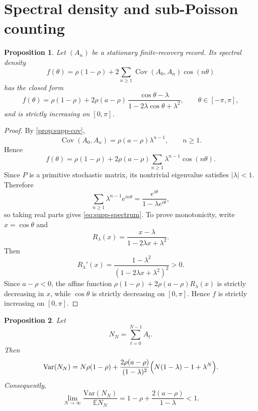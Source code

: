 \documentclass[11pt]{amsart}
\numberwithin{equation}{section}
\newtheorem{proposition}{Proposition}[section]
\theoremstyle{remark}
\newcommand{\EE}{\mathbb{E}}
\newcommand{\Var}{\mathrm{Var}}
\begin{document}
\section{Spectral density and sub-Poisson counting}\label{sec:supp-spectrum}

\begin{proposition}\label{prop:supp-spectrum}
Let $(A_n)$ be a stationary finite-recovery record. Its spectral density
\[
f(\theta)=\rho(1-\rho)+2\sum_{n\ge1}\operatorname{Cov}(A_0,A_n)\cos(n\theta)
\]
has the closed form
\begin{equation}\label{eq:supp-spectrum}
f(\theta)=
\rho(1-\rho)+2\rho(a-\rho)\,
\frac{\cos\theta-\lambda}{1-2\lambda\cos\theta+\lambda^2},
\qquad \theta\in[-\pi,\pi],
\end{equation}
and is strictly increasing on $[0,\pi]$.
\end{proposition}

\begin{proof}
By \cref{prop:supp-cov},
\[
\operatorname{Cov}(A_0,A_n)=\rho(a-\rho)\lambda^{n-1},\qquad n\ge1.
\]
Hence
\[
f(\theta)=
\rho(1-\rho)+2\rho(a-\rho)\sum_{n\ge1}\lambda^{n-1}\cos(n\theta).
\]
Since $P$ is a primitive stochastic matrix, its nontrivial eigenvalue satisfies $|\lambda|<1$. Therefore
\[
\sum_{n\ge1}\lambda^{n-1}e^{in\theta}
=
\frac{e^{i\theta}}{1-\lambda e^{i\theta}},
\]
so taking real parts gives \cref{eq:supp-spectrum}. To prove monotonicity, write $x=\cos\theta$ and
\[
R_\lambda(x)=\frac{x-\lambda}{1-2\lambda x+\lambda^2}.
\]
Then
\[
R_\lambda'(x)=\frac{1-\lambda^2}{(1-2\lambda x+\lambda^2)^2}>0.
\]
Since $a-\rho<0$, the affine function $\rho(1-\rho)+2\rho(a-\rho)R_\lambda(x)$ is strictly decreasing in $x$, while $\cos\theta$ is strictly decreasing on $[0,\pi]$. Hence $f$ is strictly increasing on $[0,\pi]$.
\end{proof}

\begin{proposition}\label{prop:supp-fano}
Let
\[
N_N=\sum_{t=0}^{N-1}A_t.
\]
Then
\begin{equation}\label{eq:supp-count-var}
\Var(N_N)=
N\rho(1-\rho)
+
\frac{2\rho(a-\rho)}{(1-\lambda)^2}
\Bigl(N(1-\lambda)-1+\lambda^N\Bigr).
\end{equation}
Consequently,
\begin{equation}\label{eq:supp-fano}
\lim_{N\to\infty}\frac{\Var(N_N)}{\EE N_N}
=
1-\rho+\frac{2(a-\rho)}{1-\lambda}
<1.
\end{equation}
\end{proposition}
\end{document}
